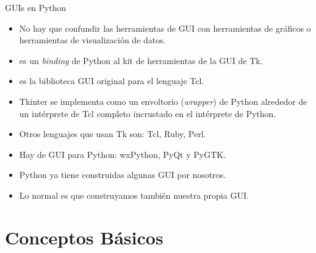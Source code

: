\documentclass[10pt, envcountsect , spanish]{beamer}
\begin{document}
\begin{frame}{GUIs en Python} 
\begin{itemize}
\item No hay que confundir las herramientas de GUI con herramientas de gráficos o herramientas de visualización de datos.
\item {} es un \textit{binding} de Python al kit de herramientas de la GUI de Tk. 
\item {} es la biblioteca GUI original para el lenguaje Tcl. 
\item Tkinter se implementa como un envoltorio (\textit{wrapper}) de Python alrededor de un intérprete de Tcl completo incrustado en el intérprete de Python. 
\item Otros lenguajes que usan Tk son: Tcl, Ruby, Perl.
\item Hay  de GUI para Python: wxPython, PyQt y PyGTK.
\item Python ya tiene construidas algunas GUI por nosotros.
\item Lo normal es que construyamos también nuestra propia GUI.
\end{itemize}
\end{frame}



\section{Conceptos Básicos}
\end{document}
